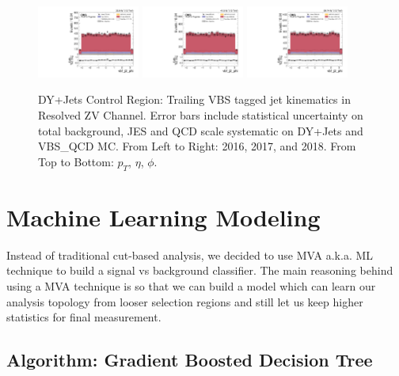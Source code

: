 \begin{figure}[!ht]
  \includegraphics[width=0.30\textwidth]{analysis_plots/2016_zjj/cr_vjets_l/vbf_j2_phi.pdf}
  \includegraphics[width=0.30\textwidth]{analysis_plots/2017_zjj/cr_vjets_l/vbf_j2_phi.pdf}
  \includegraphics[width=0.30\textwidth]{analysis_plots/2018_zjj/cr_vjets_l/vbf_j2_phi.pdf} \\
  \caption[DY+Jets Control Region: Trailing VBS tagged jet kinematics in Resolved ZV Channel]%
  {DY+Jets Control Region: Trailing VBS tagged jet kinematics in Resolved ZV Channel.
    Error bars include statistical uncertainty on total background,
    JES and QCD scale systematic on DY+Jets and VBS\_QCD MC\@. From Left to Right: 2016,
    2017, and 2018. From Top to Bottom: \( p_T \), \( \eta \), \( \phi \).}%
  \label{fig:zjj-cr-vjets-l-vbs2-pt-eta-m}
\end{figure}

\clearpage
\section{
  Machine Learning Modeling
 }

Instead of traditional cut-based analysis, we decided to use \gls{MVA} a.k.a. \gls{ML}
technique to build a signal vs background classifier. The main reasoning behind using
a \gls{MVA} technique is so that we can build a model which can learn our
analysis topology from looser selection regions and still let us keep higher statistics
for final measurement.

\subsection{
  Algorithm: Gradient Boosted Decision Tree
}

